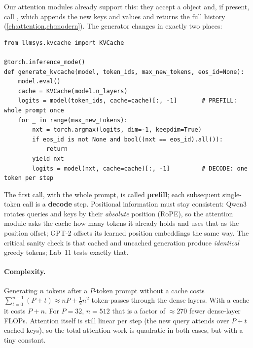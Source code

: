 Our attention modules already support this: they accept a  object and, if present,
call , which appends the new keys and values and returns
the full history (\cref{ch:attention,ch:modern}). The generator changes in exactly two places:

\begin{lstlisting}[caption={Greedy generation with a KV cache (Lab 11, Task 2).},label={lst:inference:cache}]
from llmsys.kvcache import KVCache

@torch.inference_mode()
def generate_kvcache(model, token_ids, max_new_tokens, eos_id=None):
    model.eval()
    cache = KVCache(model.n_layers)
    logits = model(token_ids, cache=cache)[:, -1]       # PREFILL: whole prompt once
    for _ in range(max_new_tokens):
        nxt = torch.argmax(logits, dim=-1, keepdim=True)
        if eos_id is not None and bool((nxt == eos_id).all()):
            return
        yield nxt
        logits = model(nxt, cache=cache)[:, -1]         # DECODE: one token per step
\end{lstlisting}

The first call, with the whole prompt, is called \textbf{prefill}; each subsequent single-token
call is a \textbf{decode} step. Positional information must stay consistent: Qwen3 rotates queries
and keys by their \emph{absolute} position (RoPE), so the attention module asks the cache how many
tokens it already holds and uses that as the position offset; GPT-2 offsets its learned position
embeddings the same way. The critical sanity check is that cached and uncached generation produce
\emph{identical} greedy tokens; Lab~11 tests exactly that.

\paragraph{Complexity.} Generating $n$ tokens after a $P$-token prompt without a cache costs
$\sum_{t=0}^{n-1}(P+t)\approx nP+\tfrac{1}{2}n^2$ token-passes through the dense layers. With a
cache it costs $P+n$. For $P=32$, $n=512$ that is a factor of $\approx270$ fewer dense-layer FLOPs.
Attention itself is still linear per step (the new query attends over $P+t$ cached keys), so the
total attention work is quadratic in both cases, but with a tiny constant.

